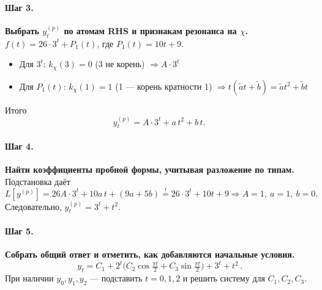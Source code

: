 \paragraph{Шаг 3.} \textbf{Выбрать \(y^{(p)}_t\) по атомам RHS и признакам резонанса на \(\chi\).}\\
\(f(t)=26\cdot 3^t + P_1(t)\), где \(P_1(t)=10t+9\). 
\begin{itemize}
\item Для \(3^t\): \(k_\chi(3)=0\) (3 не корень) \(\Rightarrow A\cdot 3^t\)
\item Для \(P_1(t)\): \(k_\chi(1)=1\) (1 — корень кратности 1) \(\Rightarrow t(\tilde a t+\tilde b)=\tilde a t^2+\tilde b t\)
\end{itemize}
Итого
\[
y^{(p)}_t=A\cdot 3^t + a\,t^2 + b\,t.
\]

\paragraph{Шаг 4.} \textbf{Найти коэффициенты пробной формы, учитывая разложение по типам.}\\
Подстановка даёт
\[
L[y^{(p)}]=26A\cdot 3^{t}+10a\,t+(9a+5b)\stackrel{!}{=}26\cdot 3^{t}+10t+9
\Rightarrow A=1,\ a=1,\ b=0.
\]
Следовательно, \(y^{(p)}_t=3^{t}+t^{2}\).

\paragraph{Шаг 5.} \textbf{Собрать общий ответ и отметить, как добавляются начальные условия.}\\
\[
\boxed{\,y_t=C_1+2^{t}\Big(C_2\cos\tfrac{\pi t}{2}+C_3\sin\tfrac{\pi t}{2}\Big)+3^{t}+t^{2}\, }.
\]
При наличии \(y_0,y_1,y_2\) — подставить \(t=0,1,2\) и решить систему для \(C_1,C_2,C_3\).
